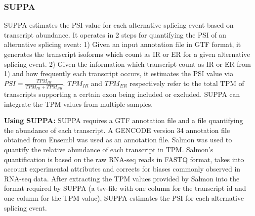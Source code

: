\subsubsection{SUPPA}\label{subsubsec:suppa}
SUPPA \cite{suppa2} estimates the PSI value for each alternative splicing event based on transcript abundance. It operates in 2 steps for quantifying the PSI of an alternative splicing event:
1) Given an input annotation file in GTF format, it generates the transcript isoforms which count as IR or ER for a given alternative splicing event.
2) Given the information which transcript count as IR or ER from 1) and how frequently each transcript occurs, it estimates the PSI value via $PSI = \frac{TPM_{IR}}{TPM_{IR} + TPM_{ER}}$. $TPM_{IR}$ and $TPM_{ER}$ respectively refer to the total TPM of transcripts supporting a certain exon being included or excluded. SUPPA can integrate the TPM values from multiple samples.


\textbf{Using SUPPA:}
SUPPA requires a GTF annotation file and a file quantifying the abundance of each transcript. A GENCODE version 34 annotation file obtained from Ensembl was used as an annotation file. Salmon \cite{salmon} was used to quantify the relative abundance of each transcript in TPM. Salmon's quantification is based on the raw RNA-seq reads in FASTQ format, takes into account experimental attributes and corrects for biases commonly observed in RNA-seq data. After extracting the TPM values provided by Salmon into the format required by SUPPA (a tsv-file with one column for the transcript id and one column for the TPM value), SUPPA estimates the PSI for each alternative splicing event.

